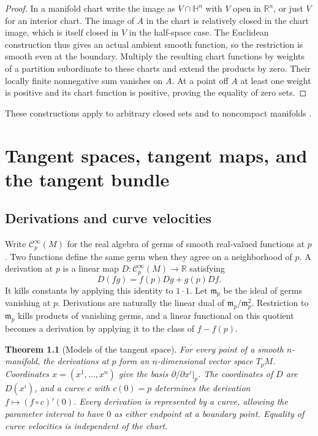 \documentclass[11pt,oneside,openany]{book}
\newtheorem{theorem}{Theorem}[chapter]
\theoremstyle{definition}
\theoremstyle{remark}
\newcommand{\R}{\mathbb R}
\newcommand{\HH}{\mathbb H}
\begin{document}
\begin{proof}
In a manifold chart write the image as \(V\cap\HH^n\) with
\(V\) open in \(\R^n\), or just \(V\) for an interior chart.
The image of \(A\) in the chart is relatively closed in the chart
image, which is itself
closed in \(V\) in the half-space case. The Euclidean
construction thus gives an actual ambient smooth function,
so the restriction is smooth even at the boundary. Multiply
the resulting chart functions by weights of a partition
subordinate to these charts and extend the products by zero.
Their locally finite nonnegative sum vanishes on \(A\).
At a point off \(A\) at least one weight is positive and its
chart function is positive, proving the equality of zero sets.
\end{proof}

These constructions apply to arbitrary closed sets and to noncompact
manifolds \cite[Lemma~2.26, Proposition~2.28, and Theorem~2.29]{lee}.
\chapter{Tangent spaces, tangent maps, and the tangent bundle}

\section{Derivations and curve velocities}

Write \(\mathcal C_p^\infty(M)\) for the real algebra of germs
of smooth real-valued functions at \(p\). Two functions define
the same germ when they agree on a neighborhood of \(p\).
A derivation at \(p\) is a linear map
\(D:\mathcal C_p^\infty(M)\to\R\) satisfying
\[
 D(fg)=f(p)Dg+g(p)Df.
\]
It kills constants by applying this identity to \(1\cdot1\).
Let \(\mathfrak m_p\) be the ideal of germs vanishing at \(p\).
Derivations are naturally the linear dual of
\(\mathfrak m_p/\mathfrak m_p^2\). Restriction to
\(\mathfrak m_p\) kills products of vanishing germs, and a
linear functional on this quotient becomes a derivation by
applying it to the class of \(f-f(p)\).

\begin{theorem}[Models of the tangent space]\label{p104:M02.01}
For every point of a smooth \(n\)-manifold, the derivations at
\(p\) form an \(n\)-dimensional vector space \(T_pM\).
Coordinates \(x=(x^1,\ldots,x^n)\) give the basis
\(\partial/\partial x^i|_p\). The coordinates of \(D\) are
\(D(x^i)\), and a curve \(c\) with \(c(0)=p\) determines the
derivation \(f\mapsto (f\circ c)'(0)\). Every derivation is
represented by a curve, allowing the parameter interval to
have \(0\) as either endpoint at a boundary point. Equality
of curve velocities is independent of the chart.
\end{theorem}
\end{document}
